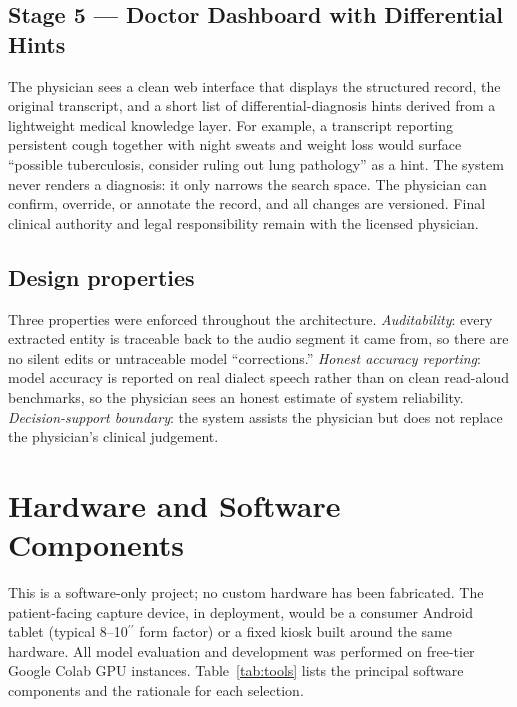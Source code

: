 \documentclass[12pt,a4paper]{article}
\begin{document}
\subsection{Stage 5 --- Doctor Dashboard with Differential Hints}
The physician sees a clean web interface that displays the
structured record, the original transcript, and a short list of
differential-diagnosis hints derived from a lightweight medical
knowledge layer. For example, a transcript reporting persistent
cough together with night sweats and weight loss would surface
``possible tuberculosis, consider ruling out lung pathology'' as a
hint. The system never renders a diagnosis: it only narrows the
search space. The physician can confirm, override, or annotate the
record, and all changes are versioned. Final clinical authority and
legal responsibility remain with the licensed physician.

\subsection{Design properties}
Three properties were enforced throughout the architecture.
\textit{Auditability}: every extracted entity is traceable back to
the audio segment it came from, so there are no silent edits or
untraceable model ``corrections.''
\textit{Honest accuracy reporting}: model accuracy is reported on
real dialect speech rather than on clean read-aloud benchmarks, so
the physician sees an honest estimate of system reliability.
\textit{Decision-support boundary}: the system assists the
physician but does not replace the physician's clinical judgement.

\section{Hardware and Software Components}

This is a software-only project; no custom hardware has been
fabricated. The patient-facing capture device, in deployment, would
be a consumer Android tablet (typical 8--10$^{\prime\prime}$ form
factor) or a fixed kiosk built around the same hardware. All model
evaluation and development was performed on free-tier Google Colab
GPU instances. Table~\ref{tab:tools} lists the principal software
components and the rationale for each selection.
\end{document}
